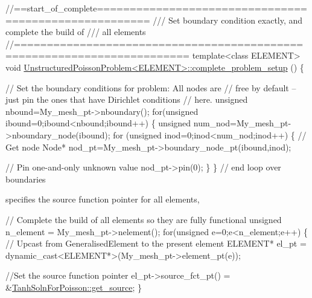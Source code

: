 \begin{DoxyCodeInclude}
\textcolor{comment}{//==start\_of\_complete======================================================}
\textcolor{comment}{ /// Set boundary condition exactly, and complete the build of }
\textcolor{comment}{}\textcolor{comment}{ /// all elements}
\textcolor{comment}{}\textcolor{comment}{//========================================================================}
\textcolor{keyword}{template}<\textcolor{keyword}{class} ELEMENT>
\textcolor{keywordtype}{void} \hyperlink{classUnstructuredPoissonProblem_a5cbf00790e8469b43c64c6aaadfe7b41}{UnstructuredPoissonProblem<ELEMENT>::complete\_problem\_setup}
      ()
\{   

 \textcolor{comment}{// Set the boundary conditions for problem: All nodes are}
 \textcolor{comment}{// free by default -- just pin the ones that have Dirichlet conditions}
 \textcolor{comment}{// here. }
 \textcolor{keywordtype}{unsigned} nbound=My\_mesh\_pt->nboundary();
 \textcolor{keywordflow}{for}(\textcolor{keywordtype}{unsigned} ibound=0;ibound<nbound;ibound++)
  \{
   \textcolor{keywordtype}{unsigned} num\_nod=My\_mesh\_pt->nboundary\_node(ibound);
   \textcolor{keywordflow}{for} (\textcolor{keywordtype}{unsigned} inod=0;inod<num\_nod;inod++)
    \{
     \textcolor{comment}{// Get node}
     Node* nod\_pt=My\_mesh\_pt->boundary\_node\_pt(ibound,inod);
     
     \textcolor{comment}{// Pin one-and-only unknown value}
     nod\_pt->pin(0);
    \}   
  \} \textcolor{comment}{// end loop over boundaries}

\end{DoxyCodeInclude}


specifies the source function pointer for all elements,


\begin{DoxyCodeInclude}
 
 
 \textcolor{comment}{// Complete the build of all elements so they are fully functional}
 \textcolor{keywordtype}{unsigned} n\_element = My\_mesh\_pt->nelement();
 \textcolor{keywordflow}{for}(\textcolor{keywordtype}{unsigned} e=0;e<n\_element;e++)
  \{
   \textcolor{comment}{// Upcast from GeneralisedElement to the present element}
   ELEMENT* el\_pt = \textcolor{keyword}{dynamic\_cast<}ELEMENT*\textcolor{keyword}{>}(My\_mesh\_pt->element\_pt(e));
   
   \textcolor{comment}{//Set the source function pointer}
   el\_pt->source\_fct\_pt() = &\hyperlink{namespaceTanhSolnForPoisson_ae1b9d6789ff301e3d63a4e292213036c}{TanhSolnForPoisson::get\_source};
  \}

\end{DoxyCodeInclude}


